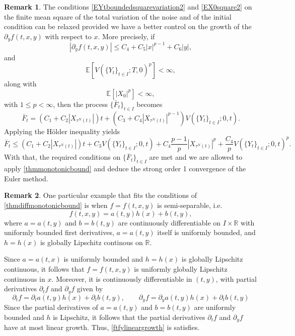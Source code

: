 \documentclass[reqno,12pt]{amsart}
\theoremstyle{plain}%
\theoremstyle{definition}
\newtheorem{rmk}{Remark}[section]
\begin{document}
\begin{rmk}
    The conditions \eqref{EYtboundedsquarevariation2} and \eqref{EX0square2} on the finite mean square of the total variation of the noise and of the initial condition can be relaxed provided we have a better control on the growth of the $\partial_y f(t, x, y)$ with respect to $x$. More precisely, if
    \[
        |\partial_y f(t, x, y)| \leq C_4 + C_5|x|^{p-1} + C_6|y|,
    \]
    and
    \[
        \mathbb{E}[V(\{Y_t\}_{t\in I}; T, 0)^p] < \infty,
    \]
    along with
    \[
        \mathbb{E}[|X_0|^p] < \infty,
    \]
    with $1 \leq p < \infty$, then the process $\{\bar F_t\}_{t\in I}$ becomes
    \[
        \bar F_t = (C_1 + C_2 |X_{\tau^N(t)}|)t + (C_3 + C_4 |X_{\tau^N(t)}|^{p-1}) V(\{Y_t\}_{t\in I}; 0, t).
    \]
    Applying the H\"older inequality yields
    \[
        \bar F_t \leq (C_1 + C_2 |X_{\tau^N(t)}|)t + C_3 V(\{Y_t\}_{t\in I}; 0, t) + C_4 \frac{p-1}{p}|X_{\tau^N(t)}|^p  + \frac{C_4}{p} V(\{Y_t\}_{t\in I}; 0, t)^p.
    \]
    With that, the required conditions on $\{\bar F_t\}_{t\in I}$ are met and we are allowed to apply \cref{thmmonotonicbound} and deduce the strong order 1 convergence of the Euler method.
\end{rmk}

\begin{rmk}
    One particular example that fits the conditions of \cref{thmdiffmonotonicbound} is when $f=f(t, x, y)$ is semi-separable, i.e.
    \begin{equation}
        \label{lineareqform}
        f(t, x, y) = a(t, y)h(x) + b(t, y),
    \end{equation}
    where $a=a(t, y)$ and $b=b(t, y)$ are continuously differentiable on $I\times \mathbb{R}$ with uniformly bounded first derivatives, $a=a(t, y)$ itself is uniformly bounded, and $h=h(x)$ is globally Lipschitz continous on $\mathbb{R}$.
    
    Since $a=a(t, x)$ is uniformly bounded and $h=h(x)$ is globally Lipschitz continuous, it follows that $f=f(t, x, y)$ is uniformly globally Lipschitz continuous in $x$. Moreover, it is continuously differentiable in $(t, y)$, with partial derivatives $\partial_t f$ and $\partial_y f$ given by
    \[
        \partial_t f = \partial_t a(t, y) h(x) + \partial_t b(t, y), \qquad \partial_y f = \partial_y a(t, y) h(x) + \partial_t b(t, y)
    \]
    Since the partial derivatives of $a=a(t, y)$ and $b=b(t, y)$ are uniformly bounded and $h$ is Lipschitz, it follows that the partial derivatives $\partial_t f$ and $\partial_y f$ have at most linear growth. Thus,  \eqref{ftfylineargrowth} is satisfies.
\end{rmk}
\end{document}
